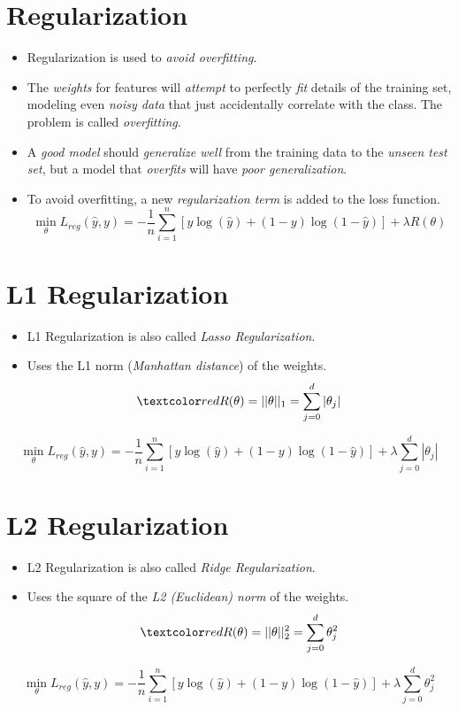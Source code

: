 \documentclass[
	number={4},
	title={Logistic Regression}
]{cs584notes}
\begin{document}
\section{Regularization}\label{sec:regularization}
\begin{itemize}
	\item Regularization is used to \emph{avoid overfitting}.
	\item The \emph{weights} for features will \emph{attempt} to perfectly \emph{fit} details of the training set, modeling even \emph{noisy data} that just accidentally correlate with the class.
	The problem is called \emph{overfitting}.
	\item A \emph{good model} should \emph{generalize well} from the training data to the \emph{unseen test set}, but a model that \emph{overfits} will have \emph{poor generalization}.
	\item To avoid overfitting, a new \emph{regularization term}  is added to the loss function.
	\begin{equation}
		\min_{\theta} L_{reg}(\hat{y}, y) = -\frac{1}{n} \sum_{i=1}^{n} \left[ y\log(\hat{y}) + (1 - y)\log(1 - \hat{y}) \right] + \lambda R(\theta)
		\label{eq:regulatization}
	\end{equation}
\end{itemize}

\section{L1 Regularization}\label{sec:l1-regularization}
\begin{itemize}
	\item L1 Regularization is also called \emph{Lasso Regularization}.
	\item Uses the L1 norm (\emph{Manhattan distance}) of the weights.
	\[ \data{ R(\theta) = ||\theta||_{1} = \sum_{j=0}^{d} |\theta_{j}| } \]
\end{itemize}
\begin{equation}
	\min_{\theta} L_{reg}(\hat{y}, y) = -\frac{1}{n} \sum_{i=1}^{n} \left[ y\log(\hat{y}) + (1 - y)\log(1 - \hat{y}) \right] + \lambda\sum_{j=0}^{d}|\theta_{j}|
	\label{eq:l1-regulatization}
\end{equation}

\section{L2 Regularization}\label{sec:l2-regularization}
\begin{itemize}
	\item L2 Regularization is also called \emph{Ridge Regularization}.
	\item Uses the square of the \emph{L2 (Euclidean) norm} of the weights.
	\[ \data{ R(\theta) = ||\theta||_{2}^{2} = \sum_{j=0}^{d} \theta_{j}^{2} } \]
\end{itemize}
\begin{equation}
	\min_{\theta} L_{reg}(\hat{y}, y) = -\frac{1}{n} \sum_{i=1}^{n} \left[ y\log(\hat{y}) + (1 - y)\log(1 - \hat{y}) \right] + \lambda\sum_{j=0}^{d} \theta_{j}^{2}
	\label{eq:l2-regulatization}
\end{equation}
\end{document}

